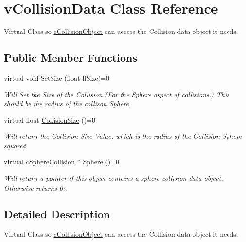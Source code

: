 \hypertarget{classv_collision_data}{
\section{vCollisionData Class Reference}
\label{classv_collision_data}
}


Virtual Class so \hyperlink{classc_collision_object}{cCollisionObject} can access the Collision data object it needs.  


\subsection*{Public Member Functions}
\begin{DoxyCompactItemize}
\item 
\hypertarget{classv_collision_data_a00a42430617c673f7716e1b543020dd3}{
virtual void \hyperlink{classv_collision_data_a00a42430617c673f7716e1b543020dd3}{SetSize} (float lfSize)=0}
\label{classv_collision_data_a00a42430617c673f7716e1b543020dd3}

\begin{DoxyCompactList}\small\item\em Will Set the Size of the Collision (For the Sphere aspect of collisions.) This should be the radius of the collison Sphere. \end{DoxyCompactList}\item 
\hypertarget{classv_collision_data_a294ee887b1da0cfd16c0f3ce22f3e42d}{
virtual float \hyperlink{classv_collision_data_a294ee887b1da0cfd16c0f3ce22f3e42d}{CollisionSize} ()=0}
\label{classv_collision_data_a294ee887b1da0cfd16c0f3ce22f3e42d}

\begin{DoxyCompactList}\small\item\em Will return the Collision Size Value, which is the radius of the Collision Sphere squared. \end{DoxyCompactList}\item 
\hypertarget{classv_collision_data_abdd66f6f80f7af9925923add7069efb0}{
virtual \hyperlink{classc_sphere_collision}{cSphereCollision} $\ast$ \hyperlink{classv_collision_data_abdd66f6f80f7af9925923add7069efb0}{Sphere} ()=0}
\label{classv_collision_data_abdd66f6f80f7af9925923add7069efb0}

\begin{DoxyCompactList}\small\item\em Will return a pointer if this object contains a sphere collision data object. Otherwise returns 0;. \end{DoxyCompactList}\end{DoxyCompactItemize}


\subsection{Detailed Description}
Virtual Class so \hyperlink{classc_collision_object}{cCollisionObject} can access the Collision data object it needs. 